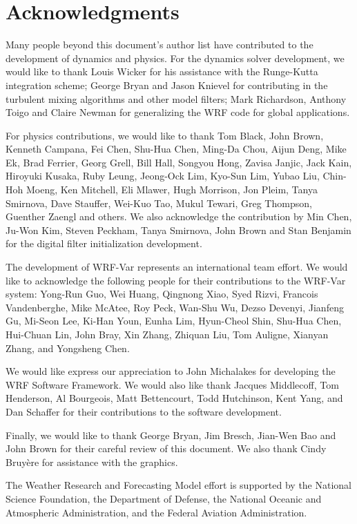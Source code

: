 \chapter*{Acknowledgments}

\hskip 15pt 
Many people beyond this document's author list have
contributed to the development of dynamics and physics.  
For the dynamics solver
development, we would like to thank Louis Wicker for his assistance with
the Runge-Kutta integration scheme; George Bryan and Jason Knievel
for contributing in the turbulent mixing algorithms and other model filters;
Mark Richardson, Anthony Toigo and Claire Newman for generalizing the
WRF code for global applications. 

\vskip 10pt
For physics contributions, we would like to thank Tom Black, John Brown, Kenneth Campana, 
Fei Chen, Shu-Hua Chen, Ming-Da Chou, Aijun Deng, Mike Ek, Brad Ferrier, Georg Grell, Bill
Hall, Songyou Hong, Zavisa Janjic, Jack Kain, Hiroyuki Kusaka, 
Ruby Leung, Jeong-Ock Lim, Kyo-Sun Lim, Yubao Liu, Chin-Hoh Moeng,
Ken Mitchell, Eli Mlawer, Hugh Morrison, Jon Pleim, Tanya Smirnova, Dave Stauffer, 
Wei-Kuo Tao, Mukul Tewari, Greg Thompson, Guenther Zaengl and others.
We also acknowledge the contribution by Min Chen, Ju-Won Kim, Steven Peckham, Tanya Smirnova,
John Brown and Stan Benjamin for the digital filter initialization development.

\vskip 10pt
The development of WRF-Var represents an international team effort. 
We would like to acknowledge the following people for their
contributions to the WRF-Var system: Yong-Run Guo, Wei Huang, Qingnong
Xiao, Syed Rizvi, Francois Vandenberghe, Mike McAtee, Roy Peck, Wan-Shu Wu,
Dezso Devenyi, Jianfeng Gu, Mi-Seon Lee, Ki-Han Youn, Eunha Lim, Hyun-Cheol Shin,
Shu-Hua Chen, Hui-Chuan Lin, John Bray, Xin Zhang, Zhiquan Liu,
Tom Auligne, Xianyan Zhang, and Yongsheng Chen.

\vskip 10pt
We would like express our appreciation to John Michalakes for developing
the WRF Software Framework.  We would also like thank Jacques Middlecoff, 
Tom Henderson, Al Bourgeois, Matt Bettencourt, Todd Hutchinson, Kent Yang,
and Dan Schaffer for their contributions to the software development. 

\vskip 10pt
Finally, we would like to thank George Bryan,
Jim Bresch, Jian-Wen Bao and John Brown
for their careful review of this document.  We also thank 
Cindy Bruy\`ere for assistance with the graphics.

\vskip 10pt
The Weather Research and Forecasting Model effort
is supported by the National Science Foundation, the Department of
Defense, the National Oceanic and Atmospheric Administration, and the
Federal Aviation Administration.

